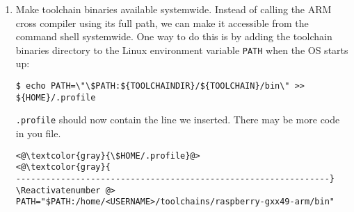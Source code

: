 \begin{enumerate}


\item Make toolchain binaries available systemwide. Instead of calling
the ARM cross compiler using its full path, we can make it accessible
from the command shell systemwide. One way to do this is by adding the
toolchain binaries directory to the Linux environment variable \texttt{PATH}
when the \ac{OS} starts up:


\begin{lstlisting}[]
$ echo PATH=\"\$PATH:${TOOLCHAINDIR}/${TOOLCHAIN}/bin\" >> ${HOME}/.profile
\end{lstlisting}
\FloatBarrier
\vspace{-5mm}


\texttt{.profile} should now contain the line we inserted. There may be more
code in you file.
\Suppressnumber\begin{lstlisting}[]
<@\textcolor{gray}{\$HOME/.profile}@>
<@\textcolor{gray}{
---------------------------------------------------------------}
\Reactivatenumber @>
PATH="$PATH:/home/<USERNAME>/toolchains/raspberry-gxx49-arm/bin"
\end{lstlisting}
\FloatBarrier
\vspace{-5mm}


\end{enumerate}
